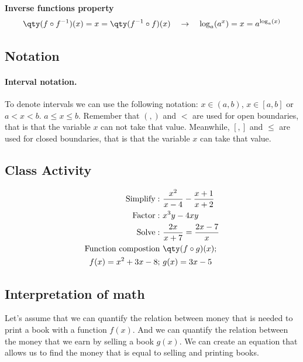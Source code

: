 \documentclass[../main-notes.tex]{subfile}
\begin{document}
\vspace{1em}

\begin{minipage}[c]{\textwidth}
    \centering
    {\bfseries\large Inverse functions property}
    \begin{gather*}
        \qty(f\circ f^{-1})(x) = x = \qty(f^{-1}\circ f)(x)
        \quad\rightarrow\quad
        \log_a(a^x) = x = a^{\log_a(x)}
    \end{gather*}
\end{minipage}

\vspace{1em}

\subsection{Notation}

\paragraph{Interval notation.} To denote intervals we can use the following notation: $x\in(a,b)$, $x\in[a,b]$ or $a<x<b$. $a\leq x\leq b$.
Remember that $(,)$ and $<$ are used for open boundaries, that is that the variable $x$ can not take that value.
Meanwhile, $[,]$ and $\leq$ are used for closed boundaries, that is that the variable $x$ can take that value.


\subsection{Class Activity}

\begin{align*}
    \mathrm{Simplify: }~& \frac{x^2}{x-4} - \frac{x+1}{x+2} \\
    \mathrm{Factor: }~& x^3y-4xy \\
    \mathrm{Solve: }~& \frac{2x}{x+7}=\frac{2x-7}{x} \\
    \mathrm{Function~compostion}~& \qty(f\circ g)(x); \\
    f(x)=x^2+3x-8;~&g(x)=3x-5
\end{align*}

\newpage


\subsection{Interpretation of math}

Let's assume that we can quantify the relation between money that is needed to print a book with a function $f(x)$.
And we can quantify the relation between the money that we earn by selling a book $g(x)$.
We can create an equation that allows us to find the money that is equal to selling and printing books.
\end{document}
